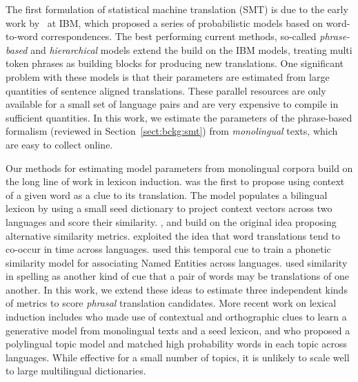\documentclass[11pt]{article}
\newcommand{\mnote}[1]{\marginpar{%
  \vskip-\baselineskip
  \raggedright\footnotesize
  \itshape\hrule\smallskip\tiny{#1}\par\smallskip\hrule}}
\newcommand{\mtodo}[1]{\mnote{\textcolor{red}{#1}}}
\newcommand{\secref}[1]{Section~\ref{#1}}
\begin{document}
The first formulation of statistical machine translation (SMT) is due to the early work by~ at IBM, which proposed a series of probabilistic models based on word-to-word correspondences.  The best performing current methods, so-called {\em phrase-based} and {\em hierarchical} models \cite{Och:2002,Koehn:2003,Chiang:2005} extend the build on the IBM models, treating multi token phrases as building blocks for producing new translations.  One significant problem with these models is that their parameters are estimated from large quantities of sentence aligned translations.  These parallel resources are only available for a small set of language pairs and are very expensive to compile in sufficient quantities.  In this work, we estimate the parameters of the phrase-based formalism (reviewed in \secref{sect:bckg:smt}) from {\em monolingual} texts, which are easy to collect online. \mtodo{Mention parallel data extraction work, e.g. Marku, Smith, Uszkoreit?}

Our methods for estimating model parameters from monolingual corpora build on the long line of work in lexicon induction.  was the first to propose using context of a given word as a clue to its translation.  The model populates a bilingual lexicon by using a small seed dictionary to project context vectors across two languages and score their similarity. , and  build on the original idea proposing alternative similarity metrics.  exploited the idea that word translations tend to co-occur in time across languages.  used this temporal cue to train a phonetic similarity model for associating Named Entities across languages.   used similarity in spelling as another kind of cue that a pair of words may be translations of one another.  In this work, we extend these ideas to estimate three independent kinds of metrics to score {\em phrasal} translation candidates.  More recent work on lexical induction includes  who made use of contextual and orthographic clues to learn a generative model from monolingual texts and a seed lexicon, and  who proposed a polylingual topic model and matched high probability words in each topic across languages.  While effective for a small number of topics, it is unlikely to scale well to large multilingual dictionaries.
\end{document}
